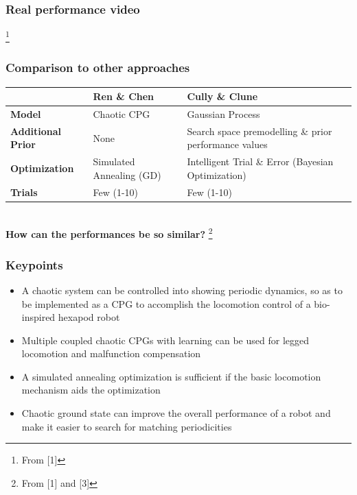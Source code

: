 \documentclass{beamer}
\begin{document}
\begin{frame}
\frametitle{Real performance video}
\begin{figure}
\center
{}
\end{figure}
\footnote{From [1]}
\end{frame}

\begin{frame}
\frametitle{Comparison to other approaches}
    \hspace*{-0.7cm}
  \centering
  \begin{tabular}{p{2cm}p{4.2cm}p{4.2cm}}
     & \textbf{Ren \& Chen} & \textbf{Cully \& Clune} \\
     \hline
    \textbf{Model} & Chaotic CPG & Gaussian Process \\
    \hline
    \textbf{Additional Prior} & None & Search space \newline premodelling \& \newline  prior performance values\\
    \hline
    \textbf{Optimization} & Simulated Annealing (GD) & Intelligent Trial \& Error \newline (Bayesian Optimization) \\
    \hline
    \textbf{Trials} & Few (1-10) & Few (1-10)
  \end{tabular}
  \\[1cm]
  \textbf{How can the performances be so similar?}
  \footnote{From [1] and [3]}
\end{frame}

\begin{frame}
\frametitle{Keypoints}
\begin{itemize}
\item A chaotic system can be controlled into showing periodic dynamics, so as to be implemented as a CPG to accomplish the locomotion control of a bio-inspired hexapod robot
\item Multiple coupled chaotic CPGs with learning can be used for legged locomotion and malfunction compensation
\item A simulated annealing optimization is sufficient if the basic locomotion mechanism aids the optimization
\item Chaotic ground state can improve the overall performance of a robot and make it easier to search for matching periodicities
\end{itemize}

\end{frame}
\end{document}
